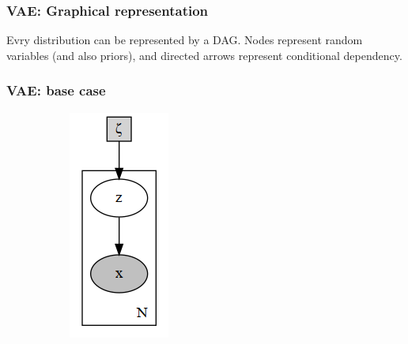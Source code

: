 \documentclass[final]{beamer}
\theoremstyle{plain}
\theoremstyle{definition}
\theoremstyle{remark}
\begin{document}
\begin{frame}
\frametitle{VAE: Graphical representation}
Evry distribution can be represented by a DAG. Nodes represent random variables
(and also priors), and directed arrows represent conditional dependency.

\end{frame}


\begin{frame}
\frametitle{VAE: base case}

\begin{figure}[h]
\centering
\begin{subfigure}[b]{0.2\textwidth}
\includegraphics[width=\textwidth]{plots/vae_p.gv.png}

\end{subfigure}
\end{figure}
\end{frame}
\end{document}

